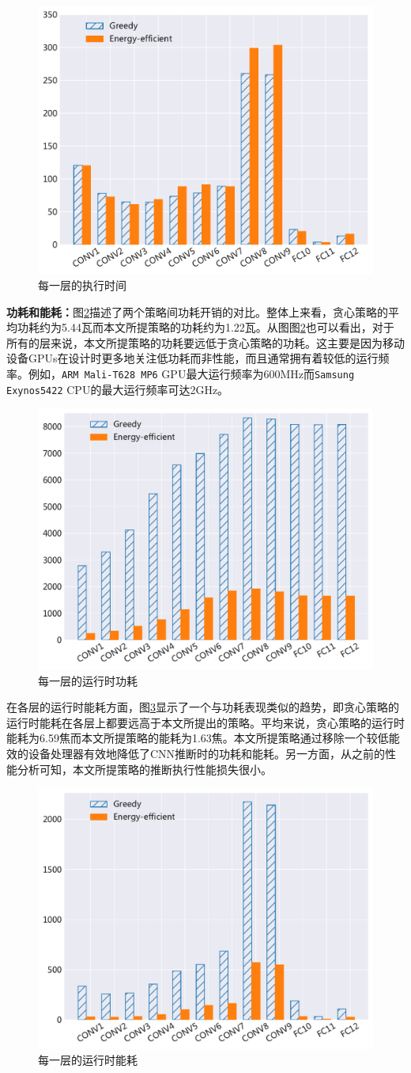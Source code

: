 \begin{figure}[htbp]
    \centering
    \includegraphics[height=0.4\textwidth]{figures/hc_time.pdf}
    \caption{每一层的执行时间}\label{figure:figure32}
\end{figure}

\textbf{功耗和能耗：}图\ref{figure:figure33}描述了两个策略间功耗开销的对比。整体上来看，贪心策略的平均功耗约为5.44瓦而本文所提策略的功耗约为1.22瓦。从图图\ref{figure:figure33}也可以看出，对于所有的层来说，本文所提策略的功耗要远低于贪心策略的功耗。这主要是因为移动设备GPUs在设计时更多地关注低功耗而非性能，而且通常拥有着较低的运行频率。例如，\texttt{ARM Mali-T628 MP6} GPU最大运行频率为600MHz而\texttt{Samsung Exynos5422} CPU的最大运行频率可达2GHz\cite{hardkernel.com}。

\begin{figure}[htbp]
    \centering
    \includegraphics[height=0.4\textwidth]{figures/hc_power.pdf}
    \caption{每一层的运行时功耗}\label{figure:figure33}
\end{figure}

在各层的运行时能耗方面，图\ref{figure:figure34}显示了一个与功耗表现类似的趋势，即贪心策略的运行时能耗在各层上都要远高于本文所提出的策略。平均来说，贪心策略的运行时能耗为6.59焦而本文所提策略的能耗为1.63焦。本文所提策略通过移除一个较低能效的设备处理器有效地降低了CNN推断时的功耗和能耗。另一方面，从之前的性能分析可知，本文所提策略的推断执行性能损失很小。

\begin{figure}[htbp]
    \centering
    \includegraphics[height=0.4\textwidth]{figures/hc_energy.pdf}
    \caption{每一层的运行时能耗}\label{figure:figure34}
\end{figure}

